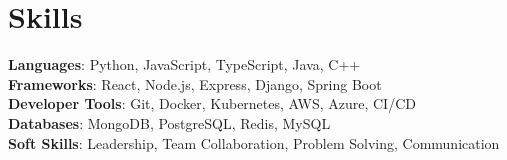 \documentclass[A4,11pt]{article}
\begin{document}
  \section{Skills}
  \begin{itemize}[leftmargin=0.5cm, label={}]
    \small{\item{
      \textbf{Languages}{: Python, JavaScript, TypeScript, Java, C++} \\ \textbf{Frameworks}{: React, Node.js, Express, Django, Spring Boot} \\ \textbf{Developer Tools}{: Git, Docker, Kubernetes, AWS, Azure, CI/CD} \\ \textbf{Databases}{: MongoDB, PostgreSQL, Redis, MySQL} \\ \textbf{Soft Skills}{: Leadership, Team Collaboration, Problem Solving, Communication}
      }}
      \end{itemize}
  
  
\end{document}
